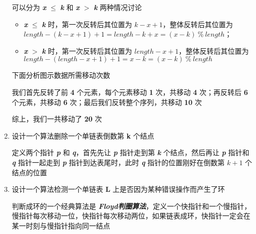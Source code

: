 \begin{enumerate}
\begin{mquote}
            \par 可以分为  \textbf{\textit{x}} $\leq$ \textbf{\textit{k}} 和 \textbf{\textit{x}} $>$ \textbf{\textit{k}} 两种情况讨论
            \begin{itemize}
                \item \textbf{\textit{x}} $\leq$ \textbf{\textit{k}} 时，第一次反转后其位置为 $k - x + 1$，整体反转后其位置为 $length - (k - x + 1) + 1 = length - k + x = (x - k) \ \% \ length$；
                \item \textbf{\textit{x}} $>$ \textbf{\textit{k}} 时，第一次反转后其位置为 $length - x + 1$，整体反转后其位置为 $length - (length - x + 1) + 1 = x - k = (x - k) \ \% \ length$
            \end{itemize}
        \end{mquote}
        
        \begin{mquote}
            \par 下面分析图示数据所需移动次数
            \par 我们首先反转了前 \textbf{4} 个元素，每个元素移动 \textbf{1} 次，共移动 \textbf{4} 次；再反转后 \textbf{6} 个元素，共移动 \textbf{6} 次；最后我们反转整个序列，共移动 \textbf{10} 次
            \par 综上，我们一共移动了 \textbf{20} 次
        \end{mquote}
    \item 设计一个算法删除一个单链表倒数第 \textbf{k} 个结点
        \begin{mquote}
            \par 定义两个指针 \textbf{\textit{p}} 和 \textbf{\textit{q}}，首先先让 \textbf{\textit{p}} 指针走到第 \textbf{\textit{k}} 个结点，然后再让 \textbf{\textit{p}} 指针和 \textbf{\textit{q}} 指针一起走到 \textbf{\textit{p}} 指针到达表尾时，此时 \textbf{\textit{q}} 指针的位置刚好在倒数第 $k + 1$ 个结点的位置
        \end{mquote}
        
    \item 设计一个算法检测一个单链表 \textbf{L} 上是否因为某种错误操作而产生了环
        \begin{mquote}
            \par 判断成环的一个经典算法是 \textbf{\textit{Floyd判圈算法}}，定义一个快指针和一个慢指针，慢指针每次移动一位，快指针每次移动两位，如果链表成环，快指针一定会在某一时刻与慢指针指向同一结点
        \end{mquote}
        
\end{enumerate}